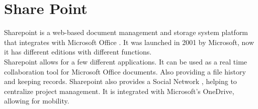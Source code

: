 \section{Share Point}

Sharepoint is a web-based document management and storage system platform that 
integrates with Microsoft Office \cite{www-hid-sp18-601-spoint-website}. It was
 launched in 2001 by Microsoft, now it 
has different editions with different functions.\\

Sharepoint allows for a few different applications. It can be used as a real 
time collaboration tool for Microsoft Office documents. Also providing a 
file history and keeping records. Sharepoint also provides a Social Network 
\cite{www-hid-sp18-601-spoint-new-sharepoint}, 
helping to centralize project management. It is integrated with Microsoft's 
OneDrive, allowing for mobility.\\